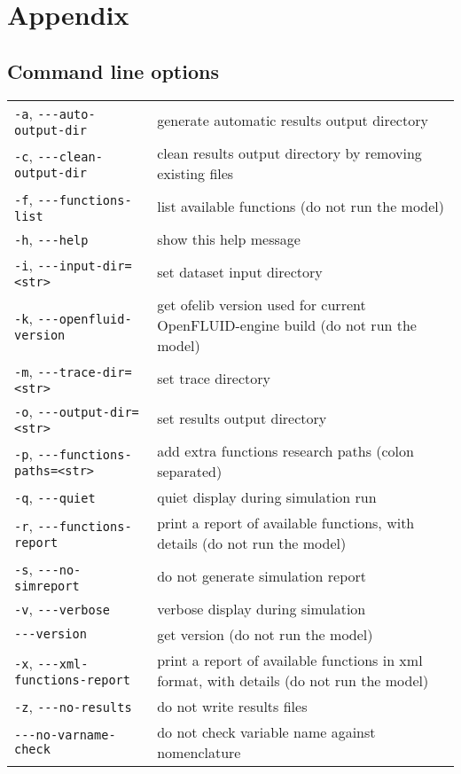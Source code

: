 \chapter{Appendix}



\section{Command line options}

\begin{center}
\begin{tabularx}{\linewidth}{lX}
\texttt{-a}, \verb?---?\texttt{auto-output-dir}&generate automatic results output directory\\
\texttt{-c}, \verb?---?\texttt{clean-output-dir}&clean results output directory by removing existing files\\
\texttt{-f}, \verb?---?\texttt{functions-list}&list available functions (do not run the model)\\
\texttt{-h}, \verb?---?\texttt{help}&show this help message\\
\texttt{-i}, \verb?---?\texttt{input-dir=<str>}&set dataset input directory\\
\texttt{-k}, \verb?---?\texttt{openfluid-version}&get ofelib version used for current OpenFLUID-engine build (do not run the model)\\
\texttt{-m}, \verb?---?\texttt{trace-dir=<str>}&set trace directory\\
\texttt{-o}, \verb?---?\texttt{output-dir=<str>}&set results output directory\\
\texttt{-p}, \verb?---?\texttt{functions-paths=<str>}&add extra functions research paths (colon separated)\\
\texttt{-q}, \verb?---?\texttt{quiet}&quiet display during simulation run\\
\texttt{-r}, \verb?---?\texttt{functions-report}&print a report of available functions, with details (do not run the model)\\
\texttt{-s}, \verb?---?\texttt{no-simreport}&do not generate simulation report\\
\texttt{-v}, \verb?---?\texttt{verbose}&verbose display during simulation\\
\verb?---?\texttt{version}&get version (do not run the model)\\
\texttt{-x}, \verb?---?\texttt{xml-functions-report}&print a report of available functions in xml format, with details (do not run the model)\\
\texttt{-z}, \verb?---?\texttt{no-results}&do not write results files\\
\verb?---?\texttt{no-varname-check}&do not check variable name against nomenclature\\
\end{tabularx}
\end{center}



